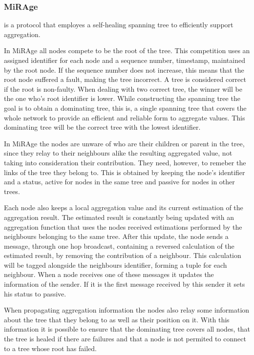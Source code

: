 \subsubsection{\Gls{MiRAge}}
\label{subsubsection:mirage}
 \cite{Costa2018} is a protocol that employes a self-healing spanning
tree to efficiently support aggregation.

In MiRAge all nodes compete to be the root of the tree. This competition uses an assigned
identifier for each node and a sequence number, timestamp, maintained by the root node.
If the sequence number does not increase, this means that the root node suffered a fault,
making the tree incorrect. A tree is considered correct if the root is non-faulty. When
dealing with two correct tree, the winner will be the one who's root identifier is lower.
While constructing the spanning tree the goal is to obtain a dominating tree, this is, a
single spanning tree that covers the whole network to provide an efficient and reliable form
to aggregate values. This dominating tree will be the correct tree with the lowest identifier.

In MiRAge the nodes are unware of who are their children or parent in the tree, since they
relay to their neighbours alike the resulting aggregated value, not taking into consideration
their contribution. They need, however, to remeber the links of the tree they belong to. This
is obtained by keeping the node's identifier and a status, active for nodes in the same tree
and passive for nodes in other trees.

Each node also keeps a local aggregation value and its current estimation of the aggregation
result. The estimated result is constantly being updated with an aggregation function that
uses the nodes received estimations performed by the neighbours belonging to the same tree.
After this update, the node sends a message, through one hop broadcast, containing a reversed
calculation of the estimated result, by removing the contribution of a neighbour. This
calculation will be tagged alongside the neighbours identifier, forming a tuple for each
neighbour. When a node receives one of these messages it updates the information of the sender.
If it is the first message received by this sender it sets his status to passive.

When propagating aggregation information the nodes also relay some information about the tree
that they belong to as well as their position on it. With this information it is possible to
ensure that the dominating tree covers all nodes, that the tree is healed if there are failures
and that a node is not permited to connect to a tree whose root has failed.


